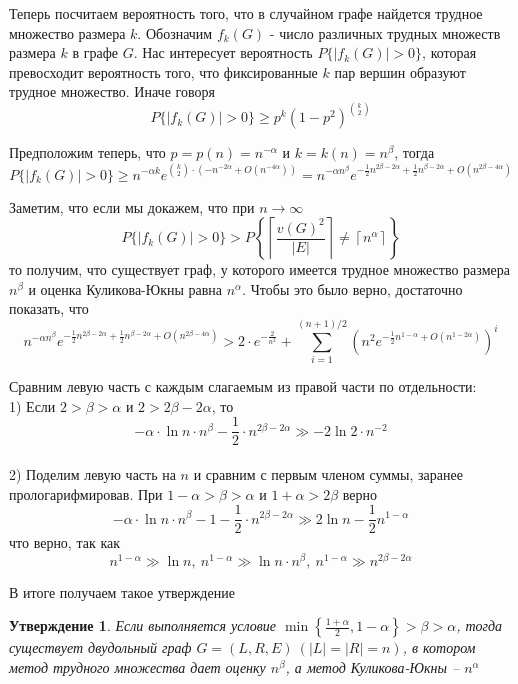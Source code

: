 \documentclass[a4paper]{article}
\newtheorem*{mclaim}{Утверждение}
\begin{document}
Теперь посчитаем вероятность того, что в случайном графе найдется трудное множество размера $k$. 
Обозначим $f_k(G)$ - число различных трудных множеств размера $k$ в графе $G$. Нас интересует 
вероятность $P\{|f_k(G)| > 0\}$, которая превосходит вероятность того, что фиксированные $k$ пар 
вершин образуют трудное множество. Иначе говоря $$P\{|f_k(G)| > 0\} \geq p^k\left(1-p^2\right)^{\binom{k}{2}}$$

Предположим теперь, что $p = p(n) = n^{-\alpha}$ и $k = k(n) = n^{\beta}$, тогда $$P\{|f_k(G)| > 0\} \geq 
n^{-\alpha k}e^{\binom{k}{2}\cdot(-n^{-2\alpha} + O(n^{-4\alpha}))} = n^{-\alpha n^{\beta}} 
e^{-\frac{1}{2}n^{2\beta-2\alpha} + \frac{1}{2}n^{\beta - 2\alpha} + O(n^{2\beta - 4\alpha})}$$

Заметим, что если мы докажем, что при $n \rightarrow \infty$ $$P\{|f_k(G)| > 0\} > P\left\{\left\lceil\frac{v(G)^2}{|E|}\right\rceil \neq 
\left\lceil n^{\alpha}\right\rceil\right\}$$ то получим, что существует граф, у которого имеется трудное множество 
размера $n^\beta$ и оценка Куликова-Юкны равна $n^{\alpha}$. Чтобы это было верно, достаточно показать, что 
$$n^{-\alpha n^{\beta}} e^{-\frac{1}{2}n^{2\beta-2\alpha} + \frac{1}{2}n^{\beta - 2\alpha} + O(n^{2\beta - 4\alpha})} > 
2\cdot e^{-\frac{2}{n^2}} + \sum\limits_{i=1}^{(n+1)/2}\left(n^2e^{-\frac{1}{2}n^{1-\alpha} + O(n^{1-2\alpha})}\right)^i$$

Сравним левую часть с каждым слагаемым из правой части по отдельности:\ \\
1) Если $2 > \beta > \alpha$ и $2 > 2\beta - 2\alpha$, то $$-\alpha\cdot \ln{n}\cdot n^{\beta} - 
\frac{1}{2}\cdot n^{2\beta - 2\alpha} \gg -2\ln{2}\cdot n^{-2}$$\ \\
2) Поделим левую часть на $n$ и сравним с первым членом суммы, заранее прологарифмировав. При 
$1-\alpha > \beta > \alpha$ и $1+\alpha > 2\beta$ верно $$-\alpha\cdot \ln{n}\cdot n^{\beta} - 1 -
\frac{1}{2}\cdot n^{2\beta - 2\alpha} \gg 2\ln{n} - \frac{1}{2}n^{1-\alpha}$$ что верно, так как 
$$n^{1-\alpha} \gg \ln{n},\ n^{1-\alpha} \gg \ln{n}\cdot n^{\beta},\ n^{1-\alpha} \gg n^{2\beta - 2\alpha}$$

В итоге получаем такое утверждение 
\begin{mclaim}
    Если выполняется условие $\min\left\{\frac{1 + \alpha}{2},1-\alpha\right\} > \beta > \alpha$, тогда 
    существует двудольный граф $G = (L, R, E)\ (|L| = |R| = n)$, в котором метод трудного множества 
    дает оценку $n^\beta$, а метод Куликова-Юкны --
    $n^\alpha$
\end{mclaim}
\end{document}
